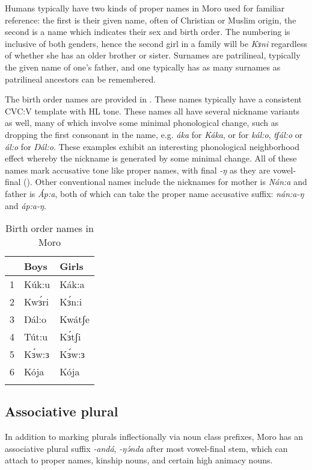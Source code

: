 Humans typically have two kinds of proper names in Moro used for familiar reference: the first is their given name, often of Christian or Muslim origin, the second is a name which indicates their sex and birth order. The numbering is inclusive of both genders, hence the second girl in a family will be \textit{Kɜni} regardless of whether she has an older brother or sister. Surnames are patrilineal, typically the given name of one's father, and one typically has as many surnames as patrilineal ancestors can be remembered.

The birth order names are provided in . These names typically have a consistent CVC:V template with HL tone. These names all have several nickname variants as well, many of which involve some minimal phonological change, such as dropping the first consonant in the name, e.g. \textit{áka} for \textit{Káka}, or  for  \textit{kál:o}, \textit{tʃál:o} or  \textit{ál:o} for \textit{Ŋál:o}. These examples exhibit an interesting phonological neighborhood effect whereby the nickname is generated by some minimal change. All of these names mark accusative tone like proper names, with final \textit{-ŋ} as they are vowel-final (). Other conventional names include the nicknames for mother is \textit{Nán:a} and father is \textit{Áp:a}, both of which can take the proper name accusative suffix: \textit{nán:a-ŋ} and \textit{áp:a-ŋ}.

\begin{table}
\caption{Birth order names in Moro}\label{tab:ch6:birthnames}
\begin{tabular}[t]{lll}
\lsptoprule
		& Boys	& Girls \\
\midrule
1 & Kúk:u & Kák:a \\
2 & Kwɜ́ri & Kɜ́n:i \\
3 & Ŋál:o & Kwátʃe \\ 
4 & Tút:u & Kɜ́tʃi \\
5 & Kɜ́w:ɜ  & Kɜ́w:ɜ \\
6 & Kója  & Kója \\
\lspbottomrule
\end{tabular}	
\end{table}

\subsection{Associative plural}\label{associative}

In addition to marking plurals inflectionally via noun class prefixes, Moro has an associative plural suffix \textit{-andá}, \textit{-ŋə́nda} after most vowel-final stem, which can attach to proper names, kinship nouns, and certain high animacy nouns. 

